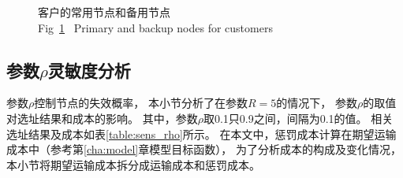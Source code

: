 \begin{figure}[hbt] %
	\centering  %
	\vspace{-0.35cm} %
	\subfigtopskip=2pt %
	\subfigbottomskip=2pt %
	\subfigcapskip=-5pt %
	\quad %
	\subfigure[二级备用]{
		\texttt{[image: figures/r3.pdf]}}
	\quad
	\caption{客户的常用节点和备用节点\\Fig~\ref{fig:result_backup}~ Primary and backup nodes for customers}
	\label{fig:result_backup}
	\vspace{-0.2cm} %
\end{figure}

\vspace{1ex}
\subsection{参数\texorpdfstring{$\rho$}{p}灵敏度分析}
参数$\rho$控制节点的失效概率，
本小节分析了在参数$R=5$的情况下，
参数$\rho$的取值对选址结果和成本的影响。
其中，参数$\rho$取0.1只0.9之间，间隔为0.1的值。
相关选址结果及成本如表\ref{table:sens_rho}所示。
在本文中，惩罚成本计算在期望运输成本中（参考第\ref{cha:model}章模型目标函数），
为了分析成本的构成及变化情况，
本小节将期望运输成本拆分成运输成本和惩罚成本。

